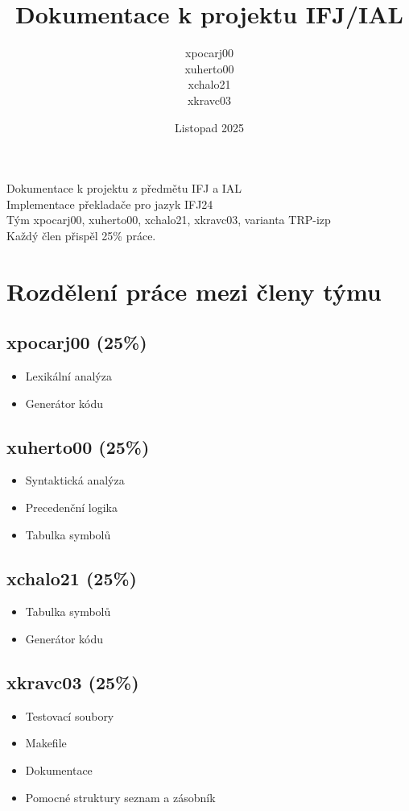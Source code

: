 \documentclass[a4paper,12pt]{article}
\title{Dokumentace k projektu IFJ/IAL}
\author{xpocarj00 \\ xuherto00 \\ xchalo21 \\ xkravc03}
\date{Listopad 2025}
\begin{document}
\maketitle

Dokumentace k projektu z předmětu IFJ a IAL\\
Implementace překladače pro jazyk IFJ24\\
Tým xpocarj00, xuherto00, xchalo21, xkravc03, varianta TRP-izp\\
Každý člen přispěl 25\% práce.

\tableofcontents
\newpage

\section{Rozdělení práce mezi členy týmu}

\subsection{xpocarj00 (25\%)}
\begin{itemize}
    \item Lexikální analýza
    \item Generátor kódu
\end{itemize}

\subsection{xuherto00 (25\%)}
\begin{itemize}
    \item Syntaktická analýza
    \item Precedenční logika
    \item Tabulka symbolů
\end{itemize}

\subsection{xchalo21 (25\%)}
\begin{itemize}
    \item Tabulka symbolů
    \item Generátor kódu
\end{itemize}

\subsection{xkravc03 (25\%)}
\begin{itemize}
    \item Testovací soubory
    \item Makefile
    \item Dokumentace
    \item Pomocné struktury seznam a zásobník
\end{itemize}
\end{document}
